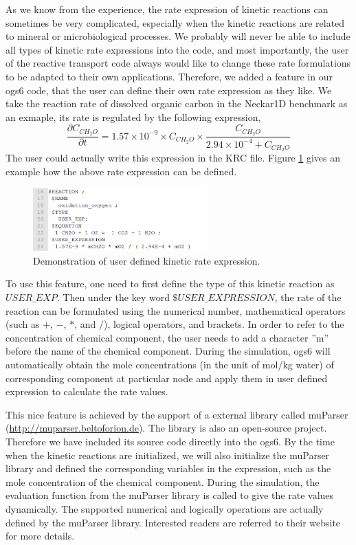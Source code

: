 As we know from the experience, the rate expression of kinetic reactions can sometimes be very complicated, especially when the kinetic reactions are related to mineral or microbiological processes. We probably will never be able to include all types of kinetic rate expressions into the code, and most importantly, the user of the reactive transport code always would like to change these rate formulations to be adapted to their own applications. Therefore, we added a feature in our ogs6 code, that the user can define their own rate expression as they like. We take the reaction rate of dissolved organic carbon in the Neckar1D benchmark as an exmaple, its rate is regulated by the following expression, 
\begin{equation}
\frac{\partial C_{CH_2O}}{\partial t} = 1.57 \times 10^{-9} \times C_{CH_2O} \times \frac{C_{CH_2O}}{2.94 \times 10^{-4} + C_{CH_2O}}
\end{equation}
The user could actually write this expression in the KRC file.  Figure \ref{fig:RT_fig_user_exp} gives an example how the above rate expression can be defined. 

\begin{figure}
\includegraphics[width=0.6\textwidth]{RT/figs/RT_fig_user_exp}
\caption{Demonstration of user defined kinetic rate expression. }
\label{fig:RT_fig_user_exp}
\end{figure}

To use this feature, one need to first define the type of this kinetic reaction as $USER\_EXP$. Then under the key word $\$USER\_EXPRESSION$, the rate of the reaction can be formulated using the numerical number, mathematical operators (such as $+$, $-$, $*$, and $/$), logical operators, and brackets. In order to refer to the concentration of chemical component, the user needs to add a character ''m'' before the name of the chemical component. During the simulation, ogs6 will automatically obtain the mole concentrations (in the unit of mol$\slash$kg water) of corresponding component at particular node and apply them in user defined expression to calculate the rate values. 

This nice feature is achieved by the support of a external library called muParser (\url{http://muparser.beltoforion.de}). The library is also an open-source project. Therefore we have included its source code directly into the ogs6. By the time when the kinetic reactions are initialized, we will also initialize the muParser library and defined the corresponding variables in the expression, such as the mole concentration of the chemical component. During the simulation, the evaluation function from the muParser library is called to give the rate values dynamically. The supported numerical and logically operations are actually defined by the muParser library. Interested readers are referred to their website for more details. 

